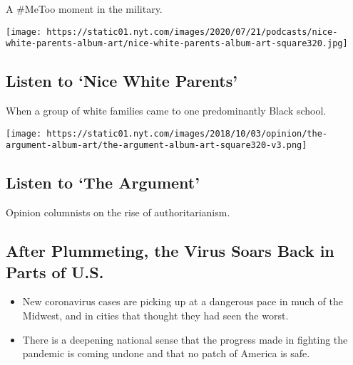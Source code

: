 A \#MeToo moment in the military.

\href{/2020/07/30/podcasts/nice-white-parents-serial.html}{}

\texttt{[image: https://static01.nyt.com/images/2020/07/21/podcasts/nice-white-parents-album-art/nice-white-parents-album-art-square320.jpg]}

\href{/2020/07/30/podcasts/nice-white-parents-serial.html}{}

\hypertarget{listen-to-nice-white-parents}{%
\subsection{Listen to `Nice White
Parents'}\label{listen-to-nice-white-parents}}

When a group of white families came to one predominantly Black school.

\href{/2020/07/30/opinion/the-argument-authoritarianism-anne-applebaum.html}{}

\texttt{[image: https://static01.nyt.com/images/2018/10/03/opinion/the-argument-album-art/the-argument-album-art-square320-v3.png]}

\href{/2020/07/30/opinion/the-argument-authoritarianism-anne-applebaum.html}{}

\hypertarget{listen-to-the-argument}{%
\subsection{Listen to `The Argument'}\label{listen-to-the-argument}}

Opinion columnists on the rise of authoritarianism.

\href{/2020/08/01/us/coronavirus-midwest-cases-deaths.html}{}

\hypertarget{after-plummeting-the-virus-soars-back-in-parts-of-us}{%
\subsection{After Plummeting, the Virus Soars Back in Parts of
U.S.}\label{after-plummeting-the-virus-soars-back-in-parts-of-us}}

\begin{itemize}
\tightlist
\item
  New coronavirus cases are picking up at a dangerous pace in much of
  the Midwest, and in cities that thought they had seen the worst.
\item
  There is a deepening national sense that the progress made in fighting
  the pandemic is coming undone and that no patch of America is safe.
\end{itemize}

